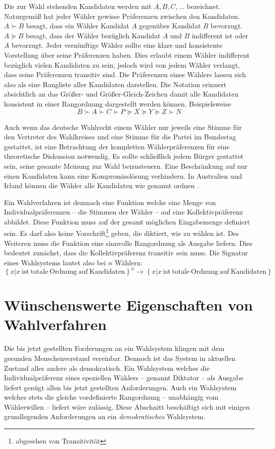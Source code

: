 \documentclass[BCOR5mm,DIV12,a4paper,10pt]{scrartcl}
\begin{document}
Die zur Wahl stehenden Kandidaten werden mit $A, B, C, ...$ bezeichnet. Naturgemäß hat jeder Wähler gewisse Präferenzen zwischen den Kandidaten. $ A \succ B $ besagt, dass ein Wähler Kandidat $A$ gegenüber Kandidat $B$ bevorzugt. $ A \succeq B$ besagt, dass der Wähler bezüglich Kandidat $A$ und $B$ indifferent ist oder $A$ bevorzugt. Jeder vernünftige Wähler sollte eine klare und konsistente Vorstellung über seine Präferenzen haben. Dies erlaubt einem Wähler indifferent bezüglich vielen Kandidaten zu sein, jedoch wird von jedem Wähler verlangt, dass seine Präferenzen transitiv sind. Die Präferenzen eines Wählers lassen sich also als eine Rangliste aller Kandidaten darstellen. Die Notation erinnert absichtlich an das Größer- und Größer-Gleich-Zeichen damit alle Kandidaten konsistent in einer Rangordnung dargestellt werden können. Beispielsweise
$$ B \succ A \succ C \succ P \succeq X \succeq Y \succeq Z \succ N $$

Auch wenn das deutsche Wahlrecht einem Wähler nur jeweils eine Stimme für den Vertreter des Wahlkreises und eine Stimme für die Partei im Bundestag gestattet, ist eine Betrachtung der kompletten Wählerpräferenzen für eine theoretische Diskussion notwendig. Es sollte schließlich jedem Bürger gestattet sein, seine gesamte Meinung zur Wahl beizusteuern. Eine Beschränkung auf nur einen Kandidaten kann eine Kompromisslösung verhindern. In Australien und Irland können die Wähler alle Kandidaten wie genannt ordnen \cite{spektrum}.

Ein Wahlverfahren ist demnach eine Funktion welche eine Menge von Individualpräferenzen -- die Stimmen der Wähler -- auf eine Kollektivpräferenz abbildet. Diese Funktion muss auf der gesamt möglichen Eingabemenge definiert sein. Es darf also keine Vorschrift\footnote{abgesehen von Transitivität} geben, die diktiert, wie zu wählen ist. Des Weiteren muss die Funktion eine sinnvolle Rangordnung als Ausgabe liefern. Dies bedeutet zunächst, dass die Kollektivpräferenz transitiv sein muss. Die Signatur eines Wahlsystems lautet also bei $n$ Wählern:
$$ \left\{ x | x \ \mathrm{ist\ totale\ Ordnung\ auf\ Kandidaten} \right\} ^n \rightarrow \left\{ x | x \ \mathrm{ist\ totale\ Ordnung\ auf\ Kandidaten} \right\}$$

\section{Wünschenswerte Eigenschaften von Wahlverfahren}
Die bis jetzt gestellten Forderungen an ein Wahlsystem klingen mit dem gesunden Menschenverstand vereinbar. Dennoch ist das System in aktuellen Zustand alles andere als demokratisch. Ein Wahlsystem welches die Individualpräferenz eines speziellen Wählers -- genannt Diktator -- als Ausgabe liefert genügt allen bis jetzt gestellten Anforderungen. Auch ein Wahlsystem welches stets die gleiche vordefinierte Rangordnung -- unabhängig vom Wählerwillen -- liefert wäre zulässig. Diese Abschnitt beschäftigt sich mit einigen grundlegenden Anforderungen an ein \emph{demokratisches} Wahlsystem.
\newline
\end{document}
